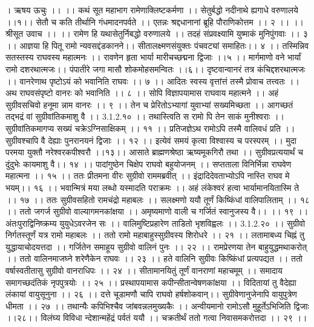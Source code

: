 । ऋषय ऊचुः ।। ।।
कथं सूत महाभाग रामेणाक्लिष्टकर्मणा ।।
सेतुर्बद्धो नदीनाथे ह्यगाधे वरुणालये ।।१।।
सेतौ च कति तीर्थानि गंधमादनपर्वते ।।
एतन्नः श्रद्दधानानां ब्रूहि पौराणिकोत्तम ।। २ ।।
।। श्रीसूत उवाच ।। ।।
रामेण हि यथासेतुर्निबद्धो वरुणालये ।।
तदहं संप्रवक्ष्यामि युष्माकं मुनिपुंगवाः ।। ३ ।।
आज्ञया हि पितू रामो न्यवसद्दंडकानने।।
सीतालक्ष्मणसंयुक्तः पंचवट्यां समाहितः।। ४ ।।
तस्मिन्निव सतस्तस्य राघवस्य महात्मनः ।।
रावणेन हृता भार्या मारीचच्छद्मना द्विजाः ।।५ ।।
मार्गमाणो वने भार्यां रामो दशरथात्मजः।।
पंपातीरे जगा मासौ शोकमोहसमन्वितः ।।६।।
दृष्टवान्वानरं तत्र कंचिद्दशरथात्मजः ।।
वानरेणाथ पृष्टोऽयं को भवानिति राघवः ।। ७ ।।
आदितः स्वस्य वृत्तांत्तं तस्मै प्रोवाच तत्त्वतः ।।
अथ राघवसंपृष्टो वानरः को भवानिति ।। ८ ।।
सोपि विज्ञापयामास राघवाय महात्मने ।।
अहं सुग्रीवसचिवो हनूमा न्नाम वानरः ।। ९ ।।
तेन च प्रेरितोऽभ्यागां युवाभ्यां सख्यमिच्छता ।।
आगच्छतं तद्भद्रं वां सुग्रीवांतिकमाशु वै ।। 3.1.2.१० ।।
तथास्त्विति स रामो पि तेन साकं मुनीश्वराः ।।
सुग्रीवांतिकमागप्य सख्यं चक्रेऽग्निसाक्षिकम् ।। ११ ।।
प्रतिजज्ञेऽथ रामोऽपि तस्मै वालिवधं प्रति ।।
सुग्रीवश्चापि वै देह्याः पुनरानयनं द्विजाः ।। १२ ।।
इत्येवं समयं कृत्वा विश्वास्य च परस्परम् ।।
मुदा परमया युक्तौ नरेश्वरकपीश्वरौ ।।१३।।
आसाते ब्राह्मणश्रेष्ठा ऋष्यमूकगिरौ तथा ।।
सुग्रीवप्रत्ययार्थं च दुंदुभेः कायमाशु वै।। १४ ।।
पादांगुष्ठेन चिक्षेप राघवो बहुयोजनम् ।।
सप्तताला विनिर्भिन्ना राघवेण महात्मना ।। १५ ।।
ततः प्रीतमना वीरः सुग्रीवो राममब्रवीत् ।।
इंद्रादिदेवताभ्योऽपि नास्ति राघव मे भयम्।। १६ ।।
भवान्मित्रं मया लब्धो यस्मादति पराक्रमः ।।
अहं लंकेश्वरं हत्वा भार्यामानयितास्मि ते ।। १७ ।।
ततः सुग्रीवसहितो रामचंद्रो महाबलः ।।
सलक्ष्मणो ययौ तूर्णं किष्किंधां वालिपालिताम् ।। १८ ।।
ततो जगर्ज सुग्रीवो वाल्यागमनकांक्षया ।।
अमृष्यमाणो वाली च गर्जितं स्वानुजस्य वै।। ।। १९ ।।
अंतःपुराद्विनिष्क्रम्य युयुधेऽवरजेन सः ।।
वालिमुष्टिप्रहारेण ताडितो भृशविह्वलः ।। 3.1.2.२० ।।
सुग्रीवो निर्गतस्तूर्णं यत्र रामो महाबलः ।।
ततो रामो महाबाहुस्सुग्रीवस्य शिरोधरे ।। २१ ।।
लतामाबध्य चिह्नं तु युद्धायाचोदयत्तदा ।।
गर्जितेन समाहूय सुग्रीवो वालिनं पुनः ।। २२ ।।
रामप्रेरणया तेन बाहुयुद्धमथाकरोत् ।।
ततो वालिनमाजघ्ने शरेणैकेन राघवः ।। २३ ।।
हते वालिनि सुग्रीवः किष्किंधां प्रत्यपद्यत ।।
ततो वर्षास्वतीतासु सुग्रीवो वानराधिपः ।। २४ ।।
सीतामानयितुं तूर्णं वानराणां महाचमूम् ।।
समादाय समागच्छदंतिकं नृपपुत्रयोः ।। २५ ।।
प्रस्थापयामास कपीन्सीतान्वेषणकांक्षया ।।
विदितायां तु वैदेह्या लंकायां वायुसूनुना ।। २६ ।।
दत्ते चूडामणौ चापि राघवो हर्षशोकवान्।।
सुग्रीवेणानुजेनापि वायुपुत्रेण धीमता ।। २७ ।।
तथान्यैः कपिभिश्चैव जांबवन्नलमुख्यकैः ।।
अन्वीयमानो रामोऽसौ मुहूर्तेऽभिजिति द्विजाः ।।२८।।
विलंघ्य विविधा न्देशान्महेंद्रं पर्वतं ययौ ।।
चक्रतीर्थं ततो गत्वा निवासमकरोत्तदा ।। २९ ।।
